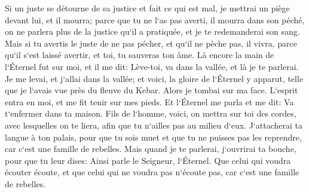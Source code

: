 \verse Si un juste se détourne de sa justice et fait ce qui est mal, je mettrai un piège devant lui, et il mourra; parce que tu ne l`as pas averti, il mourra dans son péché, on ne parlera plus de la justice qu`il a pratiquée, et je te redemanderai son sang. 
\verse Mais si tu avertis le juste de ne pas pécher, et qu`il ne pèche pas, il vivra, parce qu`il s`est laissé avertir, et toi, tu sauveras ton âme. 
\verse Là encore la main de l`Éternel fut sur moi, et il me dit: Lève-toi, va dans la vallée, et là je te parlerai. 
\verse Je me levai, et j`allai dans la vallée; et voici, la gloire de l`Éternel y apparut, telle que je l`avais vue près du fleuve du Kebar. Alors je tombai sur ma face. 
\verse L`esprit entra en moi, et me fit tenir sur mes pieds. Et l`Éternel me parla et me dit: Va t`enfermer dans ta maison. 
\verse Fils de l`homme, voici, on mettra sur toi des cordes, avec lesquelles on te liera, afin que tu n`ailles pas au milieu d`eux. 
\verse J`attacherai ta langue à ton palais, pour que tu sois muet et que tu ne puisses pas les reprendre, car c`est une famille de rebelles. 
\verse Mais quand je te parlerai, j`ouvrirai ta bouche, pour que tu leur dises: Ainsi parle le Seigneur, l`Éternel. Que celui qui voudra écouter écoute, et que celui qui ne voudra pas n`écoute pas, car c`est une famille de rebelles. 

\chapter{}

